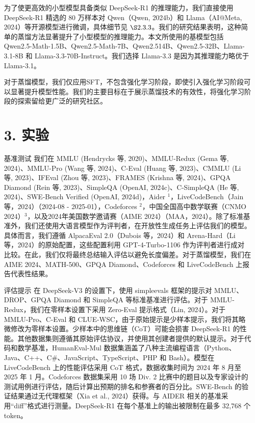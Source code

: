 \documentclass[12pt,a4paper]{report} %
\begin{document}
为了使更高效的小型模型具备类似 DeepSeek-R1 的推理能力，我们直接使用 DeepSeek-R1 精选的 80 万样本对 Qwen（Qwen, 2024b）和 Llama（AI@Meta, 2024）等开源模型进行微调，具体细节见 $\S 2.3.3$。我们的研究结果表明，这种简单的蒸馏方法显著提升了小型模型的推理能力。本文所使用的基模型包括 Qwen2.5-Math-1.5B、Qwen2.5-Math-7B、Qwen2.514B、Qwen2.5-32B、Llama-3.1-8B 和 Llama-3.3-70B-Instruct。我们选择 Llama-3.3 是因为其推理能力略优于 Llama-3.1。


对于蒸馏模型，我们仅应用SFT，不包含强化学习阶段，即使引入强化学习阶段可以显著提升模型性能。我们的主要目标在于展示蒸馏技术的有效性，将强化学习阶段的探索留给更广泛的研究社区。


\section*{3. 实验}


基准测试 我们在 MMLU (Hendrycks 等, 2020)、MMLU-Redux (Gema 等, 2024)、MMLU-Pro (Wang 等, 2024)、C-Eval (Huang 等, 2023)、CMMLU (Li 等, 2023)、IFEval (Zhou 等, 2023)、FRAMES (Krishna 等, 2024)、GPQA Diamond (Rein 等, 2023)、SimpleQA (OpenAI, 2024c)、C-SimpleQA (He 等, 2024)、SWE-Bench Verified (OpenAI,
2024d)，Aider ${ }^{1}$，LiveCodeBench（Jain 等，2024）（2024-08 - 2025-01），Codeforces ${ }^{2}$，中国全国高中数学联赛（CNMO 2024）${ }^{3}$，以及2024年美国数学邀请赛（AIME 2024）（MAA，2024）。除了标准基准外，我们还使用大语言模型作为评判者，在开放性生成任务上评估我们的模型。具体而言，我们遵循 AlpacaEval 2.0（Dubois 等，2024）和 Arena-Hard（Li 等，2024）的原始配置，这些配置利用 GPT-4-Turbo-1106 作为评判者进行成对比较。在此，我们仅将最终总结输入评估以避免长度偏差。对于蒸馏模型，我们在 AIME 2024、MATH-500、GPQA Diamond、Codeforces 和 LiveCodeBench 上报告代表性结果。


评估提示 在 DeepSeek-V3 的设置下，使用 simpleevals 框架的提示对 MMLU、DROP、GPQA Diamond 和 SimpleQA 等标准基准进行评估。对于 MMLU-Redux，我们在零样本设置下采用 Zero-Eval 提示格式（Lin, 2024）。对于 MMLU-Pro、C-Eval 和 CLUE-WSC，由于原始提示是少样本提示，我们将其略微修改为零样本设置。少样本中的思维链（CoT）可能会损害 DeepSeek-R1 的性能。其他数据集则遵循其原始评估协议，并使用其创建者提供的默认提示。对于代码和数学基准，HumanEval-Mul 数据集涵盖了八种主流编程语言（Python、Java、C++、C\#{}、JavaScript、TypeScript、PHP 和 Bash）。模型在 LiveCodeBench 上的性能评估采用 CoT 格式，数据收集时间为 2024 年 8 月至 2025 年 1 月。Codeforces 数据集采用 10 场 Div. 2 比赛中的题目以及专家设计的测试用例进行评估，随后计算出预期的排名和参赛者的百分比。SWE-Bench 的验证结果通过无代理框架（Xia et al., 2024）获得。与 AIDER 相关的基准采用“diff”格式进行测量。DeepSeek-R1 在每个基准上的输出被限制在最多 32,768 个 token。
\end{document}
